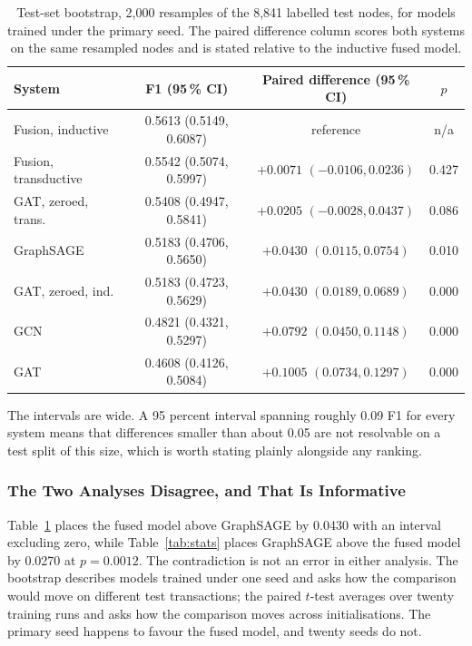 \documentclass[12pt,a4paper]{article}
\begin{document}
\begin{table}[htbp]
\centering
\small
\caption{Test-set bootstrap, 2{,}000 resamples of the 8{,}841
labelled test nodes, for models trained under the primary seed.
The paired difference column scores both systems on the same
resampled nodes and is stated relative to the inductive fused
model.}
\label{tab:bootstrap}
\begin{tabular}{lccc}
\toprule
System & F1 (95\,\% CI) & Paired difference (95\,\% CI) & $p$ \\
\midrule
Fusion, inductive     & 0.5613 (0.5149, 0.6087) & reference & n/a \\
Fusion, transductive  & 0.5542 (0.5074, 0.5997) & $+0.0071$ $(-0.0106, 0.0236)$ & 0.427 \\
GAT, zeroed, trans.   & 0.5408 (0.4947, 0.5841) & $+0.0205$ $(-0.0028, 0.0437)$ & 0.086 \\
GraphSAGE             & 0.5183 (0.4706, 0.5650) & $+0.0430$ $(0.0115, 0.0754)$ & 0.010 \\
GAT, zeroed, ind.     & 0.5183 (0.4723, 0.5629) & $+0.0430$ $(0.0189, 0.0689)$ & 0.000 \\
GCN                   & 0.4821 (0.4321, 0.5297) & $+0.0792$ $(0.0450, 0.1148)$ & 0.000 \\
GAT                   & 0.4608 (0.4126, 0.5084) & $+0.1005$ $(0.0734, 0.1297)$ & 0.000 \\
\bottomrule
\end{tabular}
\end{table}

The intervals are wide. A 95 percent interval spanning roughly
0.09 F1 for every system means that differences smaller than
about 0.05 are not resolvable on a test split of this size, which
is worth stating plainly alongside any ranking.

\subsubsection{The Two Analyses Disagree, and That Is Informative}

Table~\ref{tab:bootstrap} places the fused model above GraphSAGE
by 0.0430 with an interval excluding zero, while
Table~\ref{tab:stats} places GraphSAGE above the fused model by
0.0270 at $p = 0.0012$. The contradiction is not an error in
either analysis. The bootstrap describes models trained under one
seed and asks how the comparison would move on different test
transactions; the paired $t$-test averages over twenty training
runs and asks how the comparison moves across initialisations.
The primary seed happens to favour the fused model, and twenty
seeds do not.
\end{document}
